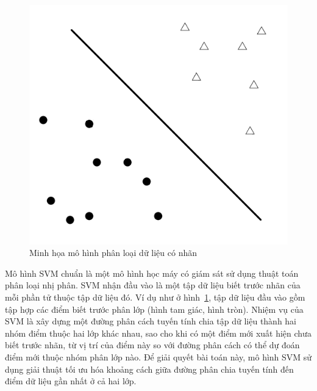 \begin{figure}[h]
\centering
\includegraphics[scale=0.5]{hinh/SVM1.png}
\caption{Minh họa mô hình phân loại dữ liệu có nhãn}
\label{fig:dataclassify}
\end{figure}
\pagebreak
Mô hình SVM chuẩn là một mô hình học máy có giám sát sử dụng thuật toán phân loại nhị phân. SVM nhận đầu vào là một tập dữ liệu biết trước nhãn của mỗi phần tử thuộc tập dữ liệu đó. Ví dụ như ở hình~\ref{fig:dataclassify}, tập dữ liệu đầu vào gồm tập hợp các điểm biết trước phân lớp (hình tam giác, hình tròn). Nhiệm vụ của SVM là xây dựng một đường phân cách tuyến tính chia tập dữ liệu thành hai nhóm điểm thuộc hai lớp khác nhau, sao cho khi có một điểm mới xuất hiện chưa biết trước nhãn, từ vị trí của điểm này so với đường phân cách có thể dự đoán điểm mới thuộc nhóm phân lớp nào. Để giải quyết bài toán này, mô hình SVM sử dụng giải thuật tối ưu hóa khoảng cách giữa đường phân chia tuyến tính đến điểm dữ liệu gần nhất ở cả hai lớp.
